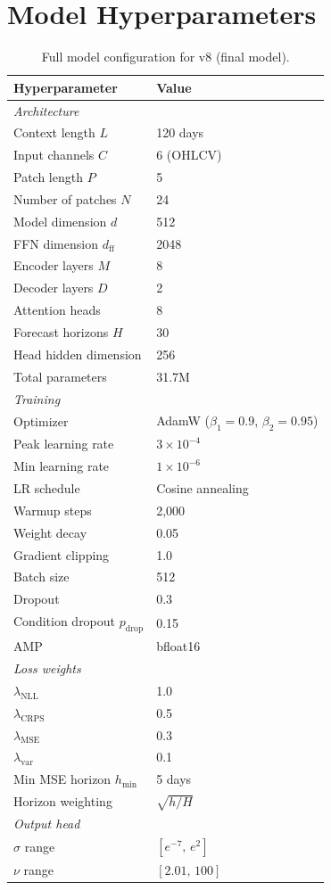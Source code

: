 \documentclass[sigconf]{acmart}
\begin{document}
\appendix

\section{Model Hyperparameters}

\begin{table}[h]
\small
\centering
\caption{Full model configuration for v8 (final model).}
\label{tab:hyperparams}
\begin{tabular}{ll}
\toprule
Hyperparameter & Value \\
\midrule
\multicolumn{2}{l}{\textit{Architecture}} \\
Context length $L$ & 120 days \\
Input channels $C$ & 6 (OHLCV) \\
Patch length $P$ & 5 \\
Number of patches $N$ & 24 \\
Model dimension $d$ & 512 \\
FFN dimension $d_\text{ff}$ & 2048 \\
Encoder layers $M$ & 8 \\
Decoder layers $D$ & 2 \\
Attention heads & 8 \\
Forecast horizons $H$ & 30 \\
Head hidden dimension & 256 \\
Total parameters & 31.7M \\
\midrule
\multicolumn{2}{l}{\textit{Training}} \\
Optimizer & AdamW ($\beta_1{=}0.9$, $\beta_2{=}0.95$) \\
Peak learning rate & $3 \times 10^{-4}$ \\
Min learning rate & $1 \times 10^{-6}$ \\
LR schedule & Cosine annealing \\
Warmup steps & 2,000 \\
Weight decay & 0.05 \\
Gradient clipping & 1.0 \\
Batch size & 512 \\
Dropout & 0.3 \\
Condition dropout $p_\text{drop}$ & 0.15 \\
AMP & bfloat16 \\
\midrule
\multicolumn{2}{l}{\textit{Loss weights}} \\
$\lambda_\text{NLL}$ & 1.0 \\
$\lambda_\text{CRPS}$ & 0.5 \\
$\lambda_\text{MSE}$ & 0.3 \\
$\lambda_\text{var}$ & 0.1 \\
Min MSE horizon $h_\text{min}$ & 5 days \\
Horizon weighting & $\sqrt{h/H}$ \\
\midrule
\multicolumn{2}{l}{\textit{Output head}} \\
$\sigma$ range & $[e^{-7},\, e^2]$ \\
$\nu$ range & $[2.01,\, 100]$ \\
\bottomrule
\end{tabular}
\end{table}
\end{document}
